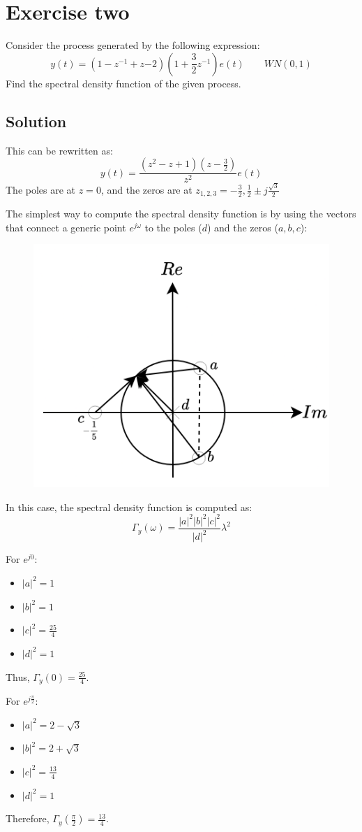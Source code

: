 \section{Exercise two}

Consider the process generated by the following expression:
\[y(t)=\left( 1-z^{-1}+z{-2} \right)\left( 1+\dfrac{3}{2}z^{-1}\right)e(t)\qquad WN(0,1)\]
Find the spectral density function of the given process.

\subsection*{Solution}
This can be rewritten as:
\[y(t)=\dfrac{\left(z^2-z+1\right)\left( z-\frac{3}{2} \right)}{z^2}e(t)\]
The poles are at $z=0$, and the zeros are at $z_{1,2,3}=-\frac{3}{2},\frac{1}{2}\pm j\frac{\sqrt{3}}{2}$

The simplest way to compute the spectral density function is by using the vectors that connect a generic point $e^{j\omega}$ to the poles ($d$) and the zeros ($a,b,c$):
\begin{figure}[H]
    \centering
    \includegraphics[width=0.5\linewidth]{images/spec1.png}
\end{figure}
In this case, the spectral density function is computed as:
\[\Gamma_y(\omega)=\dfrac{\left\lvert a \right\rvert^2\left\lvert b \right\rvert^2\left\lvert c \right\rvert^2}{\left\lvert d \right\rvert^2}\lambda^2\]

For $e^{j0}$:
\begin{itemize}
    \item $\left\lvert a \right\rvert^2=1$
    \item $\left\lvert b \right\rvert^2=1$
    \item $\left\lvert c \right\rvert^2=\frac{25}{4}$
    \item $\left\lvert d \right\rvert^2=1$
\end{itemize}
Thus, $\Gamma_y(0)=\frac{25}{4}$.

For $e^{j\frac{\pi}{2}}$:
\begin{itemize}
    \item $\left\lvert a \right\rvert^2=2-\sqrt{3}$
    \item $\left\lvert b \right\rvert^2=2+\sqrt{3}$
    \item $\left\lvert c \right\rvert^2=\frac{13}{4}$
    \item $\left\lvert d \right\rvert^2=1$
\end{itemize}
Therefore, $\Gamma_y\left(\frac{\pi}{2}\right)=\frac{13}{4}$.

